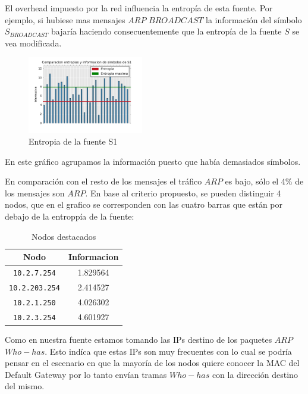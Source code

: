 El overhead impuesto por la red influencia la entropía de esta fuente.
Por ejemplo, si hubiese mas mensajes $ARP$ $BROADCAST$ la información del símbolo $S_{BROADCAST}$ bajaría haciendo consecuentemente que la entropía de la fuente $S$ se vea modificada.

\begin{figure}[H]
  \centering
    \includegraphics[width=0.45\textwidth]{grafico2-red-labos.png}
  \caption{Entropia de la fuente S1}
  \label{entropia-s1}
\end{figure}
En este gráfico agrupamos la información puesto que había demasiados símbolos.

En comparación con el resto de los mensajes el tráfico $ARP$ es bajo, sólo el 4\% de los mensajes son $ARP$. En base al criterio propuesto, se pueden distinguir 4 nodos, que en el grafico se corresponden con las cuatro barras que están por debajo de la entroppía de la fuente:   

    \begin{table}[ht]\begin{center}
      \begin{tabular}{|c|c|}
      \hline
      \textbf{Nodo} & \textbf{Informacion} \\ \hline
      \texttt{10.2.7.254}& 1.829564 \\ \hline
      \texttt{10.2.203.254}& 2.414527 \\ \hline
      \texttt{10.2.1.250}& 4.026302 \\ \hline
      \texttt{10.2.3.254}& 4.601927 \\ \hline
      \end{tabular}
      \caption{Nodos destacados}
      \label{Nodos-destacados}
    \end{center}\end{table}

Como en nuestra fuente estamos tomando las IPs destino de los paquetes $ARP$ $Who-has$. Esto indíca que estas IPs son muy frecuentes con lo cual se podría pensar en el escenario en que la mayoría de los nodos quiere conocer la MAC del Default Gateway por lo tanto envían tramas $Who-has$ con la dirección destino del mismo.


